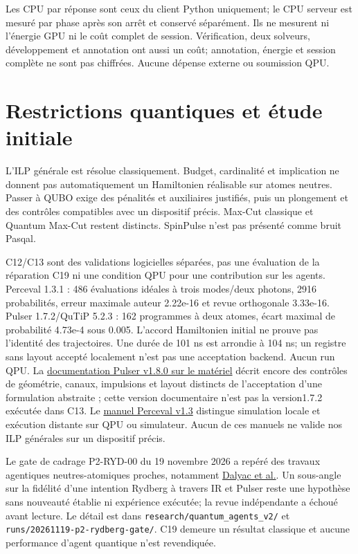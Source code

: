 \documentclass[11pt]{article}
\begin{document}
Les CPU par réponse sont ceux du client Python uniquement; le CPU serveur est mesuré par phase après son arrêt et conservé séparément. Ils ne mesurent ni l'énergie GPU ni le coût complet de session. Vérification, deux solveurs, développement et annotation ont aussi un coût; annotation, énergie et session complète ne sont pas chiffrées. Aucune dépense externe ou soumission QPU.

\section{Restrictions quantiques et étude initiale}

L'ILP générale est résolue classiquement. Budget, cardinalité et implication ne donnent pas automatiquement un Hamiltonien réalisable sur atomes neutres. Passer à QUBO exige des pénalités et auxiliaires justifiés, puis un plongement et des contrôles compatibles avec un dispositif précis. Max-Cut classique et Quantum Max-Cut restent distincts. SpinPulse n'est pas présenté comme bruit Pasqal.

C12/C13 sont des validations logicielles séparées, pas une évaluation de la réparation C19 ni une condition QPU pour une contribution sur les agents. Perceval 1.3.1 : 486 évaluations idéales à trois modes/deux photons, 2916 probabilités, erreur maximale auteur 2.22e-16 et revue orthogonale 3.33e-16. Pulser 1.7.2/QuTiP 5.2.3 : 162 programmes à deux atomes, écart maximal de probabilité 4.73e-4 sous 0.005. L'accord Hamiltonien initial ne prouve pas l'identité des trajectoires. Une durée de 101 ns est arrondie à 104 ns; un registre sans layout accepté localement n'est pas une acceptation backend. Aucun run QPU. La \href{\detokenize{https://docs.pasqal.com/pulser/v1.8.0/hardware/}}{documentation Pulser v1.8.0 sur le matériel} décrit encore des contrôles de géométrie, canaux, impulsions et layout distincts de l’acceptation d’une formulation abstraite ; cette version documentaire n’est pas la version1.7.2 exécutée dans C13. Le \href{\detokenize{https://perceval.quandela.net/docs/v1.3/reference/runtime/computer.html}}{manuel Perceval v1.3} distingue simulation locale et exécution distante sur QPU ou simulateur. Aucun de ces manuels ne valide nos ILP générales sur un dispositif précis.

Le gate de cadrage P2-RYD-00 du 19 novembre 2026 a repéré des travaux agentiques neutres-atomiques proches, notamment \href{\detokenize{https://arxiv.org/abs/2607.25834v1}}{Dalyac et al.}. Un sous-angle sur la fidélité d'une intention Rydberg à travers IR et Pulser reste une hypothèse sans nouveauté établie ni expérience exécutée; la revue indépendante a échoué avant lecture. Le détail est dans \texttt{research/\allowbreak{}quantum\_\allowbreak{}agents\_\allowbreak{}v2/\allowbreak{}} et \texttt{runs/\allowbreak{}20261119-\allowbreak{}p2-\allowbreak{}rydberg-\allowbreak{}gate/\allowbreak{}}. C19 demeure un résultat classique et aucune performance d'agent quantique n'est revendiquée.
\end{document}
